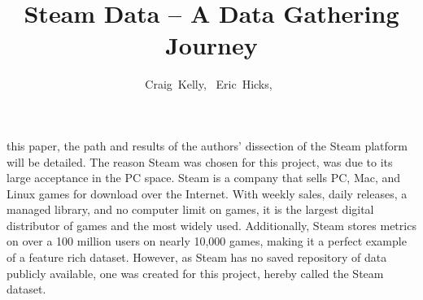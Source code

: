 \documentclass[10pt,journal,compsoc]{IEEEtran}
\begin{document}
\title{Steam Data -- A Data Gathering Journey}

\author{Craig~Kelly,~%
        Eric~Hicks,~%
}

%
{}



\maketitle

\IEEEdisplaynontitleabstractindextext

\IEEEpeerreviewmaketitle



this paper, the path and results of the authors' dissection of the Steam
platform will be detailed. The reason Steam was chosen for this project, was
due to its large acceptance in the PC space. Steam is a company that sells
PC, Mac, and Linux games for download over the Internet. With weekly sales,
daily releases, a managed library, and no computer limit on games, it is the
largest digital distributor of games and the most widely used. Additionally,
Steam stores metrics on over a 100 million users on nearly 10,000 games,
making it a perfect example of a feature rich dataset. However, as Steam has
no saved repository of data publicly available, one was created for this
project, hereby called the Steam dataset. \cite{steam}
\end{document}
